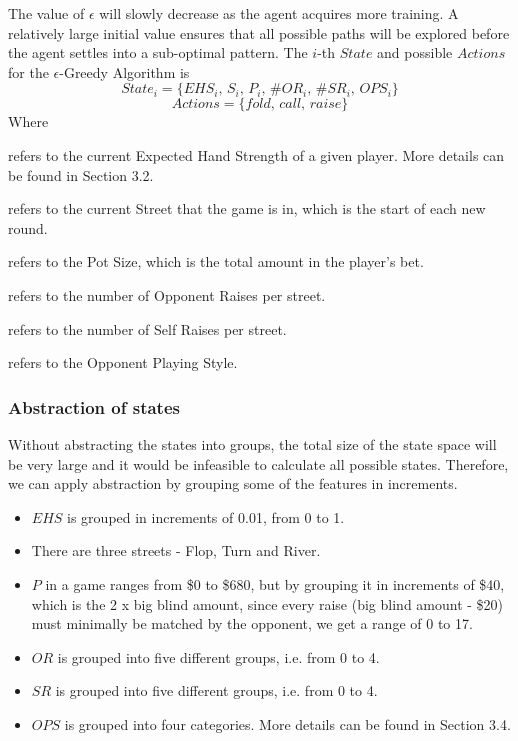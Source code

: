 \documentclass{article}
\begin{document}
The value of $\epsilon$ will slowly decrease as the agent acquires more training. A relatively large initial value ensures that all possible paths will be explored before the agent settles into a sub-optimal pattern. The $i$-th $State$ and possible $Actions$ for the $\epsilon$-Greedy Algorithm is
\begin{displaymath}
State_i = \{ EHS_i \text{, } S_i \text{, }P_i\text{, }\#OR_i\text{, }\#SR_i\text{, }OPS_i\}
\end{displaymath}
\begin{displaymath}
Actions = \{ fold\text{, }call\text{, }raise \}
\end{displaymath}
Where

\begin{description}[style=multiline,leftmargin=10mm]
\item [\emph{EHS}]refers to the current Expected Hand Strength of a given player. More details can be found in Section 3.2.
\item [\emph{S}]refers to the current Street that the game is in, which is the start of each new round.
\item [\emph{P}]refers to the Pot Size, which is the total amount in the player's bet.
\item [\emph{\#OR}]refers to the number of Opponent Raises per street.
\item [\emph{\#SR}]refers to the number of Self Raises per street.
\item [\emph{OPS}]refers to the Opponent Playing Style.
\end{description}

\subsubsection{Abstraction of states}
Without abstracting the states into groups, the total size of the state space will be very large and it would be infeasible to calculate all possible states. Therefore, we can apply abstraction by grouping some of the features in increments.
\begin{itemize}
  \item $EHS$ is grouped in increments of 0.01, from 0 to 1.
  \item There are three streets - Flop, Turn and River.
  \item $P$ in a game ranges from \$0 to \$680, but by grouping it in increments of \$40, which is the 2 x big blind amount, since every raise (big blind amount - \$20) must minimally be matched by the opponent, we get a range of 0 to 17.
  \item $OR$ is grouped into five different groups, i.e. from 0 to 4.
  \item $SR$ is grouped into five different groups, i.e. from 0 to 4.
  \item $OPS$ is grouped into four categories. More details can be found in Section 3.4.
\end{itemize}
\end{document}
